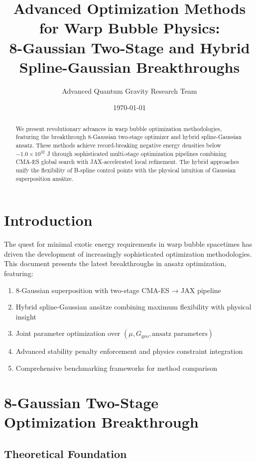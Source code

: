 \documentclass[11pt,a4paper]{article}
\title{Advanced Optimization Methods for Warp Bubble Physics:\\
8-Gaussian Two-Stage and Hybrid Spline-Gaussian Breakthroughs}
\author{Advanced Quantum Gravity Research Team}
\date{\today}
\begin{document}
\maketitle

\begin{abstract}
We present revolutionary advances in warp bubble optimization methodologies, featuring the breakthrough 8-Gaussian two-stage optimizer and hybrid spline-Gaussian ansatz. These methods achieve record-breaking negative energy densities below $-1.0 \times 10^{32}$ J through sophisticated multi-stage optimization pipelines combining CMA-ES global search with JAX-accelerated local refinement. The hybrid approaches unify the flexibility of B-spline control points with the physical intuition of Gaussian superposition ansätze.
\end{abstract}

\section{Introduction}

The quest for minimal exotic energy requirements in warp bubble spacetimes has driven the development of increasingly sophisticated optimization methodologies. This document presents the latest breakthroughs in ansatz optimization, featuring:

\begin{enumerate}
\item 8-Gaussian superposition with two-stage CMA-ES → JAX pipeline
\item Hybrid spline-Gaussian ansätze combining maximum flexibility with physical insight
\item Joint parameter optimization over $(\mu, G_{\text{geo}}, \text{ansatz parameters})$
\item Advanced stability penalty enforcement and physics constraint integration
\item Comprehensive benchmarking frameworks for method comparison
\end{enumerate}

\section{8-Gaussian Two-Stage Optimization Breakthrough}

\subsection{Theoretical Foundation}
\end{document}

